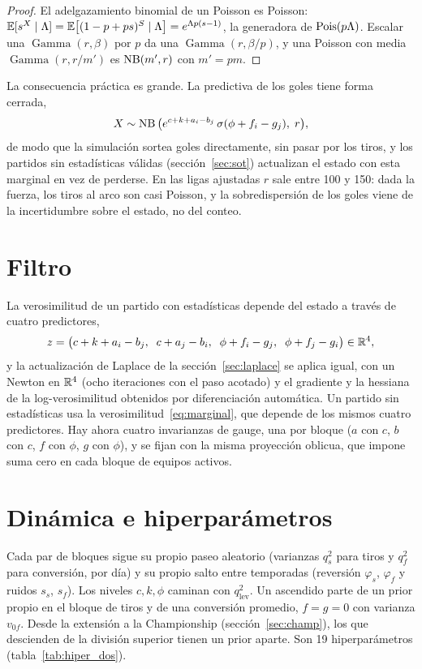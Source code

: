 \begin{proof}
El adelgazamiento binomial de un Poisson es Poisson: $\mathbb{E}[s^X\mid\Lambda]=\mathbb{E}\big[(1-p+ps)^S\mid\Lambda\big]=e^{\Lambda p(s-1)}$, la generadora de $\operatorname{Pois}(p\Lambda)$. Escalar una $\operatorname{Gamma}(r,\beta)$ por $p$ da una $\operatorname{Gamma}(r,\beta/p)$, y una Poisson con media $\operatorname{Gamma}(r,r/m')$ es $\operatorname{NB}(m',r)$ con $m'=pm$.
\end{proof}

La consecuencia práctica es grande. La predictiva de los goles tiene forma cerrada,
\begin{equation}
X\sim\operatorname{NB}\big(e^{c+k+a_i-b_j}\,\sigma(\phi+f_i-g_j),\;r\big),
\label{eq:marginal}
\end{equation}
de modo que la simulación sortea goles directamente, sin pasar por los tiros, y los partidos sin estadísticas válidas (sección~\ref{sec:sot}) actualizan el estado con esta marginal en vez de perderse. En las ligas ajustadas $r$ sale entre 100 y 150: dada la fuerza, los tiros al arco son casi Poisson, y la sobredispersión de los goles viene de la incertidumbre sobre el estado, no del conteo.

\section{Filtro}

La verosimilitud de un partido con estadísticas depende del estado a través de cuatro predictores,
\[
z=\big(c+k+a_i-b_j,\;\;c+a_j-b_i,\;\;\phi+f_i-g_j,\;\;\phi+f_j-g_i\big)\in\mathbb{R}^4,
\]
y la actualización de Laplace de la sección~\ref{sec:laplace} se aplica igual, con un Newton en $\mathbb{R}^4$ (ocho iteraciones con el paso acotado) y el gradiente y la hessiana de la log-verosimilitud obtenidos por diferenciación automática. Un partido sin estadísticas usa la verosimilitud~\eqref{eq:marginal}, que depende de los mismos cuatro predictores. Hay ahora cuatro invarianzas de gauge, una por bloque ($a$ con $c$, $b$ con $c$, $f$ con $\phi$, $g$ con $\phi$), y se fijan con la misma proyección oblicua, que impone suma cero en cada bloque de equipos activos.

\section{Dinámica e hiperparámetros}

Cada par de bloques sigue su propio paseo aleatorio (varianzas $q_s^2$ para tiros y $q_f^2$ para conversión, por día) y su propio salto entre temporadas (reversión $\varphi_s$, $\varphi_f$ y ruidos $s_s$, $s_f$). Los niveles $c,k,\phi$ caminan con $q_\text{lev}^2$. Un ascendido parte de un prior propio en el bloque de tiros y de una conversión promedio, $f=g=0$ con varianza $v_{0f}$. Desde la extensión a la Championship (sección~\ref{sec:champ}), los que descienden de la división superior tienen un prior aparte. Son 19 hiperparámetros (tabla~\ref{tab:hiper_dos}).

